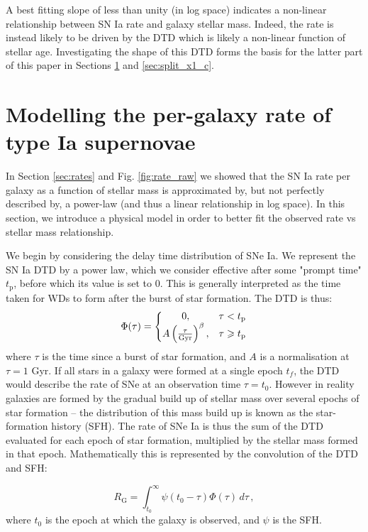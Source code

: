 \documentclass[fleqn,usenatbib]{mnras}
\begin{document}
A best fitting slope of less than unity (in log space) indicates a non-linear relationship between SN Ia rate and galaxy stellar mass. Indeed, the rate is instead likely to be driven by the DTD which is likely a non-linear function of stellar age. Investigating the shape of this DTD forms the basis for the latter part of this paper in Sections \ref{sec:model} and \ref{sec:split_x1_c}.

\section{Modelling the per-galaxy rate of type Ia supernovae}
 \label{sec:model}
 
In Section \ref{sec:rates} and Fig. \ref{fig:rate_raw} we showed that the SN Ia rate per galaxy as a function of stellar mass is approximated by, but not perfectly described by, a power-law (and thus a linear relationship in log space). In this section, we introduce a physical model in order to better fit the observed rate vs stellar mass relationship. 

We begin by considering the delay time distribution of SNe Ia.
We represent the SN Ia DTD by a power law, which we consider effective after some "prompt time" $t_{\mathrm{p}}$, before which its value is set to 0. This is generally interpreted as the time taken for WDs to form after the burst of star formation. The DTD is thus:
\begin{equation}
 \Phi(\tau) = \left\{
    \begin{array}{@{}cc@{}}
    0 , & \tau < t_{\mathrm{p}} \\
    A\left(\frac{\tau}{\mathrm{Gyr}}\right)^{\beta} , & \tau \geq t_{\mathrm{p}}
    \end{array}\right.
        \label{eq:dtd}
\end{equation} 
where $\tau$ is the time since a burst of star formation, and $A$ is a normalisation at $\tau=1$ Gyr. If all stars in a galaxy were formed at a single epoch $t_f$, the DTD would describe the rate of SNe at an observation time $\tau = t_0$. However in reality galaxies are formed by the gradual build up of stellar mass over several epochs of star formation -- the distribution of this mass build up is known as the star-formation history (SFH). The rate of SNe Ia is thus the sum of the DTD evaluated for each epoch of star formation, multiplied by the stellar mass formed in that epoch. Mathematically this is represented by the convolution of the DTD and SFH:
 
\begin{equation}
    R_{\mathrm{G}} = \int_{t_0}^{\infty} \psi(t_0-\tau)\Phi(\tau)\,d\tau \,,
    \label{eq:galaxy_rate}
\end{equation}
where $t_0$ is the epoch at which the galaxy is observed, and $\psi$ is the SFH. 
\end{document}
